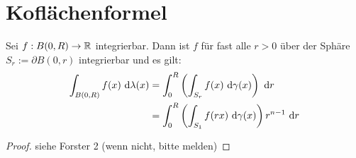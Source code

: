 \section{Koflächenformel}
\begin{satz}\enter
	Sei $f:B(0,R)\rightarrow \mathbb{R}$ integrierbar. Dann ist $f$ für fast alle $r>0$ über der Sphäre $S_r := \partial B(0,r)$ integrierbar und es gilt:
	\begin{align*}
		\int_{B(0,R)}f(x) \text{ d}\lambda(x) &= \int_0^R \left(\int_{S_r} f(x) \text{ d}\gamma(x)\right) \text{ d} r \\
																	 &= \int_0^R \left(\int_{S_1} f(rx) \text{ d}\gamma(x)\right)r^{n-1} \text{ d} r
	\end{align*}
\end{satz}
	\begin{proof}
		siehe Forster 2 (wenn nicht, bitte melden)
	\end{proof}
